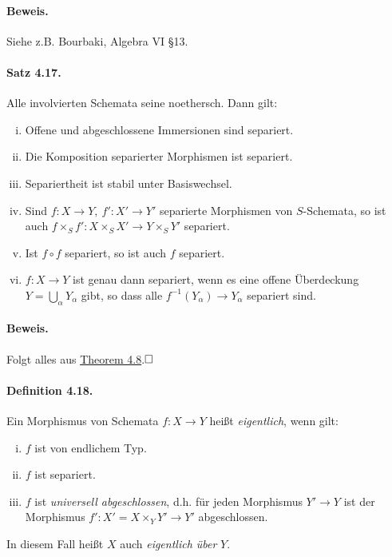 \documentclass[11pt,b5paper,openany]{memoir}
\def \qed {$\hfill\square$}
\begin{document}
\paragraph{Beweis.} Siehe z.B. Bourbaki, Algebra VI §13.

\paragraph{Satz 4.17.}\label{4.17} Alle involvierten Schemata seine noethersch. Dann gilt:
\begin{enumerate}[(i)]
\item Offene und abgeschlossene Immersionen sind separiert.
\item Die Komposition separierter Morphismen ist separiert.
\item Separiertheit ist stabil unter Basiswechsel.
\item Sind $f:X\to Y,\ f':X'\to Y'$ separierte Morphismen von $S$-Schemata, so ist auch $f\times_Sf':X\times_SX'\to Y\times_SY'$ separiert.
\item Ist $f\circ f$ separiert, so ist auch $f$ separiert.
\item $f:X\to Y$ ist genau dann separiert, wenn es eine offene Überdeckung $Y=\bigcup_\alpha Y_\alpha$ gibt, so dass alle $f^{-1}(Y_\alpha)\to Y_\alpha$ separiert sind.
\end{enumerate}

\paragraph{Beweis.} Folgt alles aus \hyperref[4.8]{Theorem 4.8}.\qed

\paragraph{Definition 4.18.}\label{4.18} Ein Morphismus von Schemata $f:X\to Y$ heißt \textit{eigentlich}, wenn gilt:
\begin{enumerate}[(i)]
\item $f$ ist von endlichem Typ.
\item $f$ ist separiert.
\item $f$ ist \textit{universell abgeschlossen}, d.h. für jeden Morphismus $Y'\to Y$ ist der Morphismus $f':X'=X\times_YY'\to Y'$ abgeschlossen.
\end{enumerate}
In diesem Fall heißt $X$ auch \textit{eigentlich über} $Y$.
\end{document}
